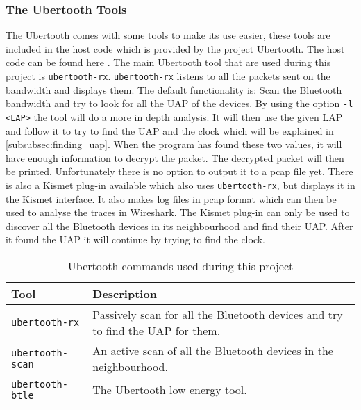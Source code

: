 \subsubsection{The Ubertooth Tools}
\label{subsubsec:ubertooth_tools}
The Ubertooth comes with some tools to make its use easier, these tools are included in the host code which is provided by the project Ubertooth. The host code can be found here \cite{hostcode}.
The main Ubertooth tool that are used during this project is \verb|ubertooth-rx|. \verb|ubertooth-rx| listens to all the packets sent on the bandwidth and displays them. The default functionality is: Scan the Bluetooth bandwidth and try to look for all the UAP of the devices. By using the option \verb|-l <LAP>| the tool will do a more in depth analysis. It will then use the given LAP and follow it to try to find the UAP and the clock which will be explained in \ref{subsubsec:finding_uap}. When the program has found these two values, it will have enough information to decrypt the packet. The decrypted packet will then be printed. Unfortunately there is no option to output it to a pcap file yet. \pend There is also a Kismet plug-in available which also uses \verb|ubertooth-rx|, but displays it in the Kismet interface. It also makes log files in pcap format which can then be used to analyse the traces in Wireshark. The Kismet plug-in can only be used to discover all the Bluetooth devices in its neighbourhood and find their UAP. After it found the UAP it will continue by trying to find the clock.

\begin{table}[!h]
\begin{tabular}{|l|l|}
\hline
Tool & Description \\
\hline
\verb|ubertooth-rx| & Passively scan for all the Bluetooth devices and try to find the UAP for them. \\
\hline
\verb|ubertooth-scan| & An active scan of all the Bluetooth devices in the neighbourhood.  \\
\hline
\verb|ubertooth-btle| & The Ubertooth low energy tool. \\
\hline
\end{tabular}
\caption{Ubertooth commands used during this project}
\label{tab:ubertooth_tools}
\end{table}
